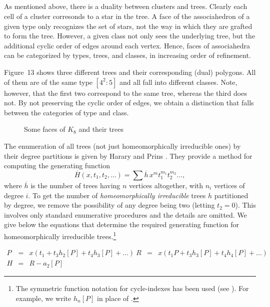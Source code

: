 \documentclass[10pt]{amsart}
\begin{document}
        \subsection{}  As mentioned above, there is a duality between clusters and trees.  Clearly each cell of a cluster corresonds to a star in the tree. A face of the associahedron of a given type only recognizes the set of stars, not the way in which they are grafted to form the tree. However, a given class not only sees the underlying tree, but the additional cyclic order of edges around each vertex. Hence, faces of associahedra can be categorized by types, trees, and classes, in increasing order of refinement.
    
    \begin{exmp}
    Figure~13 shows three different trees and their corresponding (dual) polygons.  All of them are of the same type $[4^2 : 5]$ and all fall into different classes.  Note, however, that the first two correspond to the same tree, whereas the third does not.  By not preserving the cyclic order of edges, we obtain a distinction that falls between the categories of type and class.
    \end{exmp}
    
    \begin{figure}[h]
    \caption{Some faces of $K_8$ and their trees}
    \label{phylo}
    \end{figure}
    
    The enumeration of all trees (not just homeomorphically irreducible ones) by their degree partitions is given by Harary and Prins \cite[\S4]{hpr}.  They provide a method for computing the generating function
    $$\overline{H}(x, t_1, t_2, \ldots) = \sum \overline{h} \, x^m t_1^{m_1} t_2^{m_2} \ldots,$$
    where $\overline{h}$ is the number of trees having $n$ vertices altogether, with $n_i$ vertices of degree $i$.  To get the number of {\em homeomorphically irreducible} trees $h$ partitioned by degree, we remove the possibility of any degree being two (letting $t_2=0$). This involves only standard enumerative procedures and the details are omitted.  We give below the equations that determine the required generating function for homeomorphically irreducible trees.\footnote{The symmetric function notation for cycle-indexes has been used (see \cite{r0}). For example, we write $h_n[P]$ in place of .}
  
    \begin{eqnarray*}
        P &=& x(t_1 + t_3 h_2[P] + t_4 h_3[P] + \ldots ) \

        R &=& x(t_1 P + t_3 h_3[P] + t_4 h_4[P] + \ldots )\\
        H &=& R - a_2[P]
        \end{eqnarray*}
        
\end{document}
